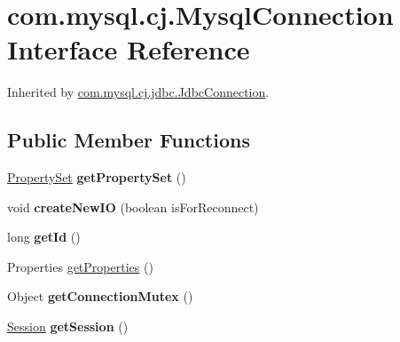 \hypertarget{interfacecom_1_1mysql_1_1cj_1_1_mysql_connection}{}\section{com.\+mysql.\+cj.\+Mysql\+Connection Interface Reference}
\label{interfacecom_1_1mysql_1_1cj_1_1_mysql_connection}


Inherited by \mbox{\hyperlink{interfacecom_1_1mysql_1_1cj_1_1jdbc_1_1_jdbc_connection}{com.\+mysql.\+cj.\+jdbc.\+Jdbc\+Connection}}.

\subsection*{Public Member Functions}
\begin{DoxyCompactItemize}
\item 
\mbox{\label{interfacecom_1_1mysql_1_1cj_1_1_mysql_connection_a51fb6a3db410136a80cda075db6a70f5}} 
\mbox{\hyperlink{interfacecom_1_1mysql_1_1cj_1_1conf_1_1_property_set}{Property\+Set}} {\bfseries get\+Property\+Set} ()
\item 
\mbox{\label{interfacecom_1_1mysql_1_1cj_1_1_mysql_connection_a95370bad49129eb6c1f5136e008e6ed1}} 
void {\bfseries create\+New\+IO} (boolean is\+For\+Reconnect)
\item 
\mbox{\label{interfacecom_1_1mysql_1_1cj_1_1_mysql_connection_aba5831e0b7016bc8b3fffa0c2e728fee}} 
long {\bfseries get\+Id} ()
\item 
Properties \mbox{\hyperlink{interfacecom_1_1mysql_1_1cj_1_1_mysql_connection_a1fde8714cc1e2176748fd4f35f0df0d1}{get\+Properties}} ()
\item 
\mbox{\label{interfacecom_1_1mysql_1_1cj_1_1_mysql_connection_a9509cf17d31eff921de41b8ecd03278f}} 
Object {\bfseries get\+Connection\+Mutex} ()
\item 
\mbox{\label{interfacecom_1_1mysql_1_1cj_1_1_mysql_connection_ac1220f01fc29222847acfba3035a860a}} 
\mbox{\hyperlink{interfacecom_1_1mysql_1_1cj_1_1_session}{Session}} {\bfseries get\+Session} ()

\end{DoxyCompactItemize}
